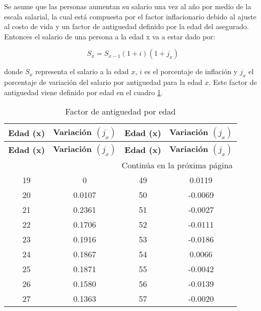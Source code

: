 \documentclass[
]{article}
\begin{document}
Se asume que las personas aumentan su salario una vez al año por medio
de la escala salarial, la cual está compuesta por el factor
inflacionario debido al ajuste al costo de vida y un factor de
antiguedad definido por la edad del asegurado. Entonces el salario de
una persona a la edad x va a estar dado por:

\[S_x = S_{x-1}(1+i)(1+j_x)\]

donde \(S_x\) representa el salario a la edad \(x\), \(i\) es el
porcentaje de inflación y \(j_x\) el porcentaje de variación del salario
por antiguedad para la edad \(x\). Este factor de antiguedad viene
definido por edad en el cuadro \ref{tab:salario}.

\begin{longtable}{|c|c|c|c|}
    \caption{Factor de antiguedad por edad} \label{tab:salario} \\
    \hline
  \rowcolor{turquoise}
  \textbf{Edad (x)} & \textbf{Variación $(j_x)$} & \textbf{Edad (x)} & \textbf{Variación $(j_x)$} \\
  \hline
  \endfirsthead

  \hline
  \rowcolor{turquoise}
  \textbf{Edad (x)} & \textbf{Variación $(j_x)$} & \textbf{Edad (x)} & \textbf{Variación $(j_x)$} \\
  \hline
  \endhead

  \hline \multicolumn{4}{|r|}{{Continúa en la próxima página}} \\ \hline
  \endfoot

  \hline
  \endlastfoot

  19 & 0 & 49 & 0.0119 \\

  20 & 0.0107 & 50 & -0.0069 \\

  21 & 0.2361 & 51 & -0.0027 \\

  22 & 0.1706 & 52 & -0.0111 \\

  23 & 0.1916 & 53 & -0.0186 \\

  24 & 0.1867 & 54 & 0.0066 \\

  25 & 0.1871 & 55 & -0.0042 \\

  26 & 0.1580 & 56 & -0.0139 \\

  27 & 0.1363 & 57 & -0.0020 \\


\end{longtable}
\end{document}
